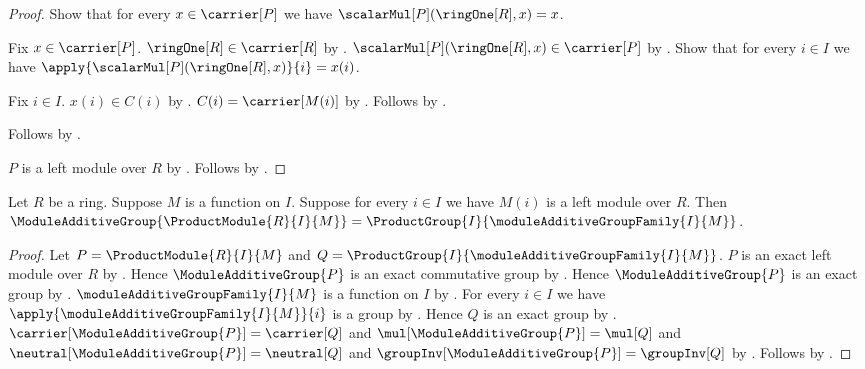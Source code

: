 \begin{proof}
    Show that for every $x\in\carrier[P]$ we have
        $\scalarMul[P](\ringOne[R],x)=x$.
    \begin{subproof}
        Fix $x\in\carrier[P]$.
        $\ringOne[R]\in\carrier[R]$ by .
        $\scalarMul[P](\ringOne[R],x)\in\carrier[P]$ by
            .
        Show that for every $i\in I$ we have
            $\apply{\scalarMul[P](\ringOne[R],x)}{i}=x(i)$.
        \begin{subproof}
            Fix $i\in I$.
            $x(i)\in C(i)$ by .
            $C(i)=\carrier[M(i)]$ by
                .
            Follows by
                .
        \end{subproof}
        Follows by .
    \end{subproof}
    $P$ is a left module over $R$ by
        .
    Follows by .
\end{proof}

\begin{theorem}\label{product_module_additive_group_exact}
    Let $R$ be a ring.
    Suppose $M$ is a function on $I$.
    Suppose for every $i\in I$ we have $M(i)$ is a left module over $R$.
    Then
        $\ModuleAdditiveGroup{\ProductModule{R}{I}{M}}
            =\ProductGroup{I}{\moduleAdditiveGroupFamily{I}{M}}$.
\end{theorem}
\begin{proof}
    Let $P=\ProductModule{R}{I}{M}$ and
        $Q=\ProductGroup{I}{\moduleAdditiveGroupFamily{I}{M}}$.
    $P$ is an exact left module over $R$ by
        .
    Hence $\ModuleAdditiveGroup{P}$ is an exact commutative group by
        .
    Hence $\ModuleAdditiveGroup{P}$ is an exact group by
        .
    $\moduleAdditiveGroupFamily{I}{M}$ is a function on $I$ by
        .
    For every $i\in I$ we have
        $\apply{\moduleAdditiveGroupFamily{I}{M}}{i}$ is a group by
        .
    Hence $Q$ is an exact group by .
    $\carrier[\ModuleAdditiveGroup{P}]=\carrier[Q]$ and
        $\mul[\ModuleAdditiveGroup{P}]=\mul[Q]$ and
        $\neutral[\ModuleAdditiveGroup{P}]=\neutral[Q]$ and
        $\groupInv[\ModuleAdditiveGroup{P}]=\groupInv[Q]$ by
        .
    Follows by .
\end{proof}

